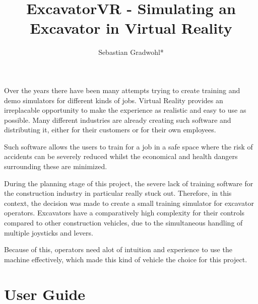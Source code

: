 \documentclass[journal]{vgtc}                     %
\title{ExcavatorVR - Simulating an Excavator in Virtual Reality}
\author{%
  Sebastian Gradwohl*
}
\begin{document}


\maketitle


Over the years there have been many attempts trying to create training and demo simulators for different kinds of jobs. Virtual Reality provides an irreplacable opportunity to make the experience as realistic and easy to use as possible.
Many different industries are already creating such software and distributing it, either for their customers or for their own employees. 

Such software allows the users to train for a  job in a safe space where the risk of accidents can be severely reduced whilst the economical and health dangers surrounding these are minimized.

During the planning stage of this project, the severe lack of training software for the construction industry in particular really stuck out. 
Therefore, in this context, the decision was made to create a small training simulator for excavator operators. Excavators have a comparatively high complexity for their controls compared to other construction vehicles, due to the simultaneous handling of multiple joysticks and levers. 

Because of this, operators need alot of intuition and experience to use the machine effectively, which made this kind of vehicle the choice for this project.

\section{User Guide}
\end{document}
